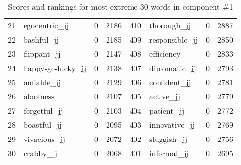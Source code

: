 \begin{table}[tbp]
\begin{tabular}{| rlr@{.}l | rlr@{.}l |}
    21 & egocentric\_jj & 0 & 2186    &    410 & thorough\_jj & 0 & 2887 \\
    22 & bashful\_jj & 0 & 2185    &    409 & responsible\_jj & 0 & 2850 \\
    23 & flippant\_jj & 0 & 2147    &    408 & efficiency & 0 & 2833 \\
    24 & happy-go-lucky\_jj & 0 & 2138    &    407 & diplomatic\_jj & 0 & 2793 \\
    25 & amiable\_jj & 0 & 2129    &    406 & confident\_jj & 0 & 2781 \\
    26 & aloofness & 0 & 2107    &    405 & active\_jj & 0 & 2779 \\
    27 & forgetful\_jj & 0 & 2103    &    404 & patient\_jj & 0 & 2772 \\
    28 & boastful\_jj & 0 & 2095    &    403 & innovative\_jj & 0 & 2769 \\
    29 & vivacious\_jj & 0 & 2072    &    402 & sluggish\_jj & 0 & 2756 \\
    30 & crabby\_jj & 0 & 2068    &    401 & informal\_jj & 0 & 2695 \\
    \hline
    \end{tabular}
    \caption{Scores and rankings for most extreme 30 words in component \#1} 
\end{table}
\clearpage

